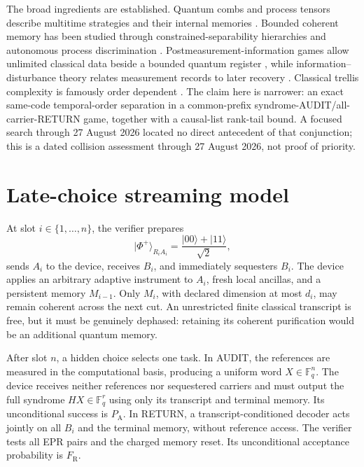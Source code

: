 \documentclass[10pt,twocolumn]{article}
\theoremstyle{remark}
\newcommand{\ket}[1]{\lvert #1\rangle}
\newcommand{\PA}{P_{\mathrm A}}
\newcommand{\FR}{F_{\mathrm R}}
\begin{document}
The broad ingredients are established. Quantum combs and process tensors
describe multitime strategies and their internal memories
\cite{chiribella2009networks,pollock2018processes,bisio2012memory}. Bounded
coherent memory has been studied through constrained-separability hierarchies
and autonomous process discrimination \cite{ohst2026memory,zonnios2026bounded}.
Postmeasurement-information games allow unlimited classical data beside a
bounded quantum register \cite{konig2005power,ballester2008postmeasurement},
while information--disturbance theory relates measurement records to later
recovery \cite{banaszek2001fidelity,gregoratti2003lostfound,hsieh2026interactive}.
Classical trellis complexity is famously order dependent
\cite{forney1994trellis,mceliece1996bcjr,kashyap2008pathwidth}. The claim here
is narrower: an exact same-code temporal-order separation in a common-prefix
syndrome-AUDIT/all-carrier-RETURN game, together with a causal-list rank-tail
bound. A focused search through 27 August 2026 located no direct antecedent of
that conjunction; this is a dated collision assessment through 27 August 2026,
not proof of priority.

\section{Late-choice streaming model}
\label{sec:model}

At slot $i\in\{1,\ldots,n\}$, the verifier prepares
\begin{equation}
\ket{\Phi^+}_{R_iA_i}=\frac{\ket{00}+\ket{11}}{\sqrt2},
\end{equation}
sends $A_i$ to the device, receives $B_i$, and immediately sequesters $B_i$.
The device applies an arbitrary adaptive instrument to $A_i$, fresh local
ancillas, and a persistent memory $M_{i-1}$. Only $M_i$, with declared
dimension at most $d_i$, may remain coherent across the next cut. An
unrestricted finite classical transcript is free, but it must be genuinely
dephased: retaining its coherent purification would be an additional quantum
memory.

After slot $n$, a hidden choice selects one task. In AUDIT, the references are
measured in the computational basis, producing a uniform word
$X\in\mathbb F_q^n$. The device receives neither references nor sequestered
carriers and must output the full syndrome $HX\in\mathbb F_q^r$ using only
its transcript and terminal memory. Its unconditional success is $\PA$. In
RETURN, a transcript-conditioned decoder acts jointly on all $B_i$ and the
terminal memory, without reference access. The verifier tests all EPR pairs
and the charged memory reset. Its unconditional acceptance probability is
$\FR$.
\end{document}
